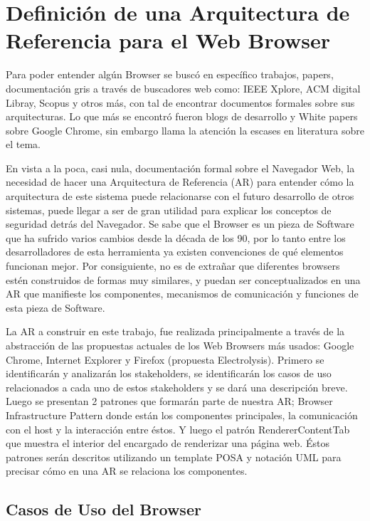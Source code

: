 \chapter{Definición de una Arquitectura de Referencia para el Web Browser}
\label{chap5:ArqRefWB}


Para poder entender algún Browser se buscó en específico trabajos, papers, documentación gris a través de buscadores web como: IEEE Xplore, ACM digital Libray, Scopus y otros más, con tal de encontrar documentos formales sobre sus arquitecturas. Lo que más se encontró fueron blogs de desarrollo y White papers sobre Google Chrome, sin embargo llama la atención la escases en literatura sobre el tema. 


En vista a la poca, casi nula, documentación formal sobre el Navegador Web, la necesidad de hacer una Arquitectura de Referencia (AR) para entender cómo la arquitectura de este sistema puede relacionarse con el futuro desarrollo de otros sistemas, puede llegar a ser de gran utilidad para explicar los conceptos de seguridad detrás del Navegador. Se sabe que el Browser es un pieza de Software que ha sufrido varios cambios desde la década de los 90, por lo tanto entre los desarrolladores de esta herramienta ya existen convenciones de qué elementos funcionan mejor. Por consiguiente, no es de extrañar que diferentes browsers estén construidos de formas muy similares, y puedan ser conceptualizados en una AR que manifieste los componentes, mecanismos de comunicación y funciones de esta pieza de Software. 


La AR a construir en este trabajo, fue realizada principalmente a través de la abstracción de las propuestas actuales de los Web Browsers más usados: Google Chrome, Internet Explorer y Firefox (propuesta Electrolysis). Primero se identificarán y analizarán los stakeholders, se identificarán los casos de uso relacionados a cada uno de estos stakeholders y se dará una descripción breve. Luego se presentan 2 patrones que formarán parte de nuestra AR; Browser Infrastructure Pattern donde están los componentes principales, la comunicación con el host y la interacción entre éstos. Y luego el patrón RendererContentTab que muestra el interior del encargado de renderizar una página web. Éstos patrones serán descritos utilizando un template POSA \cite{buschman1996system} y notación UML para precisar cómo en una AR se relaciona los componentes. 

\section{Casos de Uso del Browser}
